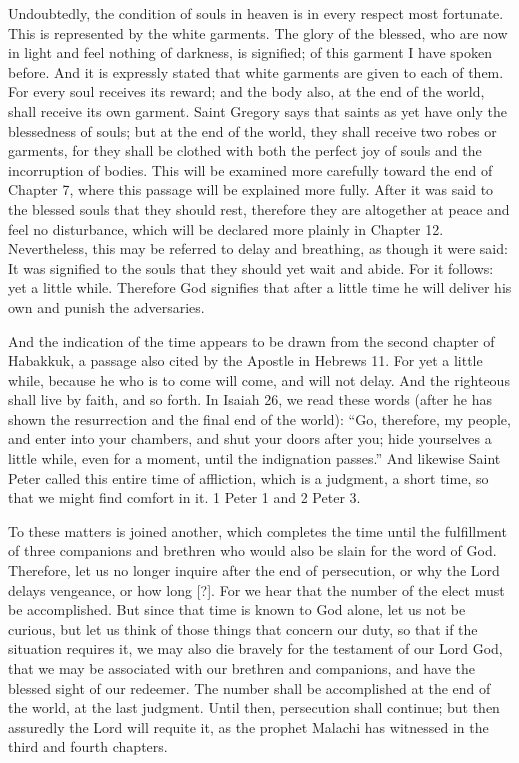 Undoubtedly, the condition of souls in heaven is in every respect most fortunate. This is represented by the white garments. The glory of the blessed, who are now in light and feel nothing of darkness, is signified; of this garment I have spoken before. And it is expressly stated that white garments are given to each of them. For every soul receives its reward; and the body also, at the end of the world, shall receive its own garment. Saint Gregory says that saints as yet have only the blessedness of souls; but at the end of the world, they shall receive two robes or garments, for they shall be clothed with both the perfect joy of souls and the incorruption of bodies. This will be examined more carefully toward the end of Chapter 7, where this passage will be explained more fully. After it was said to the blessed souls that they should rest, therefore they are altogether at peace and feel no disturbance, which will be declared more plainly in Chapter 12. Nevertheless, this may be referred to delay and breathing, as though it were said: It was signified to the souls that they should yet wait and abide. For it follows: yet a little while. Therefore God signifies that after a little time he will deliver his own and punish the adversaries.

And the indication of the time appears to be drawn from the second chapter of Habakkuk, a passage also cited by the Apostle in Hebrews 11. For yet a little while, because he who is to come will come, and will not delay. And the righteous shall live by faith, and so forth. In Isaiah 26, we read these words (after he has shown the resurrection and the final end of the world): “Go, therefore, my people, and enter into your chambers, and shut your doors after you; hide yourselves a little while, even for a moment, until the indignation passes.” And likewise Saint Peter called this entire time of affliction, which is a judgment, a short time, so that we might find comfort in it. 1 Peter 1 and 2 Peter 3.

To these matters is joined another, which completes the time until the fulfillment of three companions and brethren who would also be slain for the word of God. Therefore, let us no longer inquire after the end of persecution, or why the Lord delays vengeance, or how long [?]. For we hear that the number of the elect must be accomplished. But since that time is known to God alone, let us not be curious, but let us think of those things that concern our duty, so that if the situation requires it, we may also die bravely for the testament of our Lord God, that we may be associated with our brethren and companions, and have the blessed sight of our redeemer. The number shall be accomplished at the end of the world, at the last judgment. Until then, persecution shall continue; but then assuredly the Lord will requite it, as the prophet Malachi has witnessed in the third and fourth chapters.

